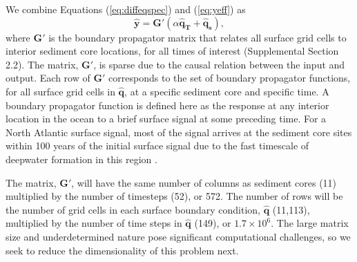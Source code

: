 \documentclass[draft]{agujournal2019}
\begin{document}
We combine Equations (\ref{eq:diffeqspec}) and (\ref{eq:yeff}) as
\begin{equation}
\label{eq:modeleq}
\mathbf{\hat{y}} = \mathbf{G}' (\alpha \mathbf{\hat{q}_{T}} + \mathbf{\hat{q}_{s}}), 
\end{equation}
where $\mathbf{G}'$ is the boundary propagator matrix that relates all
surface grid cells to interior sediment core locations, for all times
of interest (Supplemental Section 2.2).
The matrix, $\mathbf{G'}$, is sparse due to the causal
relation between the input and output.
Each row of $\mathbf{G'}$ corresponds to the set of boundary propagator
functions, for all surface grid cells in $\mathbf{\hat{q}}$, at a
specific sediment core and specific time. A boundary propagator
function is defined here as the response at any interior location in
the ocean to a brief surface signal at some preceding time.
For a North Atlantic surface signal,
most of the signal arrives at the sediment core sites within 100 years
of the initial surface signal due to the fast timescale of deepwater
formation in this region \cite{Lu-Oppo-2023:Surface}.

The matrix, $\mathbf{G}'$, will have the same number of columns as
sediment cores (11) multiplied by the number of timesteps (52), or
572. The number of rows will be the number of grid cells in each
surface boundary condition, $\mathbf{\hat{q}}$ (11,113), multiplied by
the number of time steps in $\mathbf{\hat{q}}$ (149), or
$1.7 \times 10^{6}$. The large matrix size 
and underdetermined nature pose significant computational
challenges, so we seek to reduce the dimensionality of this problem next.
\end{document}
